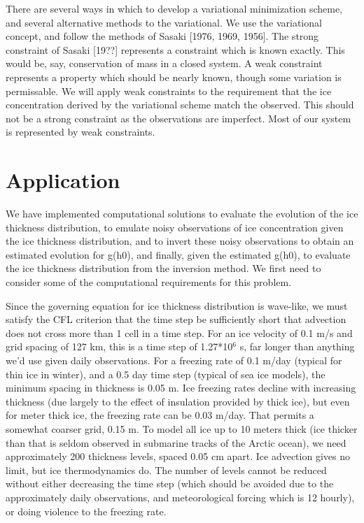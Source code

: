     There are several ways in which to develop a variational minimization
scheme, and several alternative methods to the variational.  We use the
variational concept, and follow the methods of Sasaki [1976, 1969, 1956].
The strong constraint of Sasaki [19??] represents a constraint which is
known exactly.  This would be, say, conservation of mass in a closed system.
A weak constraint represents a property which should be nearly known,
though some variation is permissable.  We will apply weak constraints to
the requirement that the ice concentration derived by the variational
scheme match the observed.  This should not be a strong constraint as
the observations are imperfect.  Most of our system is represented by
weak constraints.

\section{Application}

    We have implemented computational solutions to evaluate the evolution
of the ice thickness distribution, to emulate noisy observations of ice 
concentration given the ice thickness distribution, and to invert these
noisy observations to obtain an estimated evolution for g(h0), and finally,
given the estimated g(h0), to evaluate the ice thickness distribution from
the inversion method.  We first need to consider some of the computational
requirements for this problem.

    Since the governing equation for ice thickness distribution 
is wave-like, we must satisfy the CFL criterion that the time step be 
sufficiently short that advection does not cross more than 1 cell in a time 
step.  For an ice velocity
of 0.1 m/s and grid spacing of 127 km, this is a time step of 1.27*10$^6$ s,
far longer than anything we'd use given daily observations.  For a freezing
rate of 0.1 m/day (typical for thin ice in winter), and a 0.5 day time step 
(typical of sea ice models), the minimum spacing in thickness is 0.05 m.
Ice freezing rates decline with increasing thickness (due largely to the
effect of insulation provided by thick ice), but even for meter thick ice,
the freezing rate can be 0.03 m/day.  That permits a somewhat coarser grid,
0.15 m.  To model all ice up to 10 meters thick (ice thicker than that is seldom
observed in submarine tracks of the Arctic ocean), we need approximately 
200 thickness levels, spaced 0.05 cm apart.  Ice advection gives no limit,
but ice thermodynamics do.  The number of levels cannot be reduced without
either decreasing the time step (which should be avoided due to the approximately
daily observations, and meteorological forcing which is 12 hourly), or doing
violence to the freezing rate.

